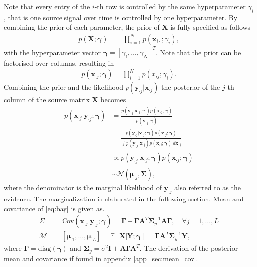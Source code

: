 Note that every entry of the $i$-th row is controlled by the same hyperparameter $\gamma_i$, that is one source signal over time is controlled by one hyperparameter. 
By combining the prior of each parameter, the prior of $\textbf{X}$ is fully specified as follows 
\begin{align*}
p (\mathbf{X} ; \boldsymbol{\gamma}) &= \prod_{i=1}^N p (\mathbf{x}_{i \cdot} ; \gamma_i),
\end{align*}
with the hyperparameter vector $\boldsymbol{\gamma} = [\gamma_1, \dots, \gamma_N]^T$. Note that the prior can be factorised over columns, resulting in 
\begin{align*}
p\left(\textbf{x}_{\cdot j};\boldsymbol{\gamma}\right) = \prod_{i=1}^{N}p\left( x_{ij};\gamma_{i}\right).
\end{align*} 
Combining the prior and the likelihood $p(\mathbf{y}_{\cdot j} \vert \mathbf{x}_{\cdot j})$ the posterior of the $j$-th column of the source matrix $\mathbf{X}$ becomes
\begin{align}
p(\mathbf{x}_{\cdot j} \vert \mathbf{y}_{\cdot j} ; \boldsymbol{\gamma}) &= \frac{p(\mathbf{y}_{\cdot j} | \mathbf{x}_{\cdot j} ; \boldsymbol{\gamma}) p(\mathbf{x}_{\cdot j} ; \boldsymbol{\gamma})}{p(\mathbf{y}_{\cdot j} | \boldsymbol{\gamma})} \nonumber \\
&= \frac{p(\mathbf{y}_{\cdot j} | \mathbf{x}_{\cdot j} ; \boldsymbol{\gamma}) p(\mathbf{x}_{\cdot j} ; \boldsymbol{\gamma})}{\int p(\mathbf{y}_{\cdot j} | \mathbf{x}_{\cdot j}) p(\mathbf{x}_{\cdot j} ; \boldsymbol{\gamma}) \ d \mathbf{x}_{\cdot j}} \nonumber \\ 
&\propto p(\mathbf{y}_{\cdot j} | \mathbf{x}_{\cdot j} ; \boldsymbol{\gamma}) p(\mathbf{x}_{\cdot j} ; \boldsymbol{\gamma}) \nonumber \\
&\sim \mathcal{N}(\boldsymbol{\mu}_{\cdot j}, \boldsymbol{\Sigma}),\label{eq:bay}
\end{align}
where the denominator is the marginal likelihood of $\mathbf{y}_{\cdot j}$ also referred to as the evidence. The marginalization is elaborated in the following section. Mean and covariance of \eqref{eq:bay} is given as.
\begin{align}
\Sigma &= \text{Cov}(\mathbf{x}_{\cdot j} \vert \mathbf{y}_{\cdot j} ; \boldsymbol{\gamma}) = \boldsymbol{\Gamma} - \boldsymbol{\Gamma} \mathbf{A}^T \boldsymbol{\Sigma}_y^{-1} \mathbf{A} \boldsymbol{\Gamma}, \quad \forall j = 1, \dots, L \label{eq:moments1} \\
\mathcal{M} &= [\boldsymbol{\mu}_{\cdot 1}, \dots, \boldsymbol{\mu}_{\cdot L}] = \mathbb{E}[\mathbf{X} \vert \mathbf{Y} ; \boldsymbol{\gamma}] = \boldsymbol{\Gamma} \mathbf{A}^T \boldsymbol{\Sigma}_y^{-1} \mathbf{Y}, \label{eq:moments2} 
\end{align}
where $\boldsymbol{\Gamma} = \text{diag}(\boldsymbol{\gamma})$ and $\boldsymbol{\Sigma}_y = \sigma^2 \mathbf{I} + \mathbf{A} \boldsymbol{\Gamma} \mathbf{A}^T$. The derivation of the posterior mean and covariance if found in appendix \ref{app_sec:mean_cov}.   

